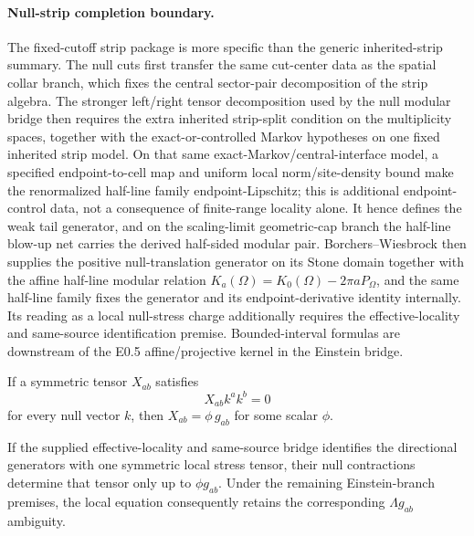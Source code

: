 \paragraph{Null-strip completion boundary.}
The fixed-cutoff strip package is more specific than the generic inherited-strip summary.
The null cuts first transfer the same cut-center data as the spatial collar branch, which fixes
the central sector-pair decomposition of the strip algebra. The stronger left/right tensor
decomposition used by the null modular bridge then requires the extra inherited strip-split
condition on the multiplicity spaces, together with the exact-or-controlled Markov hypotheses on
one fixed inherited strip model. On that same exact-Markov/central-interface model, a specified
endpoint-to-cell map and uniform local norm/site-density bound make the renormalized half-line family
endpoint-Lipschitz; this is additional endpoint-control data, not a consequence of finite-range
locality alone. It hence defines the weak tail generator, and on the scaling-limit
geometric-cap branch the half-line blow-up net carries the derived half-sided modular pair.
Borchers--Wiesbrock then supplies the positive null-translation generator on its Stone domain
together with the affine half-line modular relation \(K_a(\Omega)=K_0(\Omega)-2\pi aP_\Omega\),
and the same half-line family fixes the generator and its endpoint-derivative identity internally.
Its reading as a local null-stress charge additionally requires the effective-locality and
same-source identification premise.
Bounded-interval formulas are downstream of the E0.5 affine/projective kernel in the Einstein bridge.

\begin{lemma}
If a symmetric tensor \(X_{ab}\) satisfies
\[
X_{ab}k^ak^b=0
\]
for every null vector \(k\), then \(X_{ab}=\phi\,g_{ab}\) for some scalar \(\phi\).
\end{lemma}

\begin{corollary}
If the supplied effective-locality and same-source bridge identifies the directional generators
with one symmetric local stress tensor, their null contractions determine that tensor only up to
\(\phi g_{ab}\). Under the remaining Einstein-branch premises, the local equation consequently
retains the corresponding \(\Lambda g_{ab}\) ambiguity.
\end{corollary}

